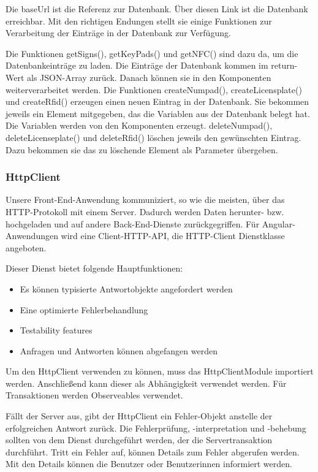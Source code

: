 Die baseUrl ist die Referenz zur Datenbank. Über diesen Link ist die Datenbank erreichbar. Mit den richtigen Endungen stellt sie einige Funktionen zur Verarbeitung der Einträge in der Datenbank zur Verfügung.

Die Funktionen getSigns(), getKeyPads() und getNFC() sind dazu da, um die Datenbankeinträge zu laden. Die Einträge der Datenbank kommen im return-Wert als JSON-Array zurück. Danach können sie in den Komponenten weiterverarbeitet werden.
Die Funktionen createNumpad(), createLicensplate() und createRfid() erzeugen einen neuen Eintrag in der Datenbank. Sie bekommen jeweils ein Element mitgegeben, das die Variablen aus der Datenbank belegt hat. Die Variablen werden von den Komponenten erzeugt.
deleteNumpad(), deleteLicenseplate() und deleteRfid() löschen jeweils den gewünschten Eintrag. Dazu bekommen sie das zu löschende Element als Parameter übergeben.


\subsubsection{HttpClient}
Unsere Front-End-Anwendung kommuniziert, so wie die meisten, über das HTTP-Protokoll mit einem Server. Dadurch werden Daten herunter- bzw. hochgeladen und auf andere Back-End-Dienste zurückgegriffen. Für Angular-Anwendungen wird eine Client-HTTP-API, die HTTP-Client Dienstklasse angeboten.

Dieser Dienst bietet folgende Hauptfunktionen:
\begin{itemize}
    \item Es können typisierte Antwortobjekte angefordert werden
    \item Eine optimierte Fehlerbehandlung
    \item Testability features
    \item Anfragen und Antworten können abgefangen werden    
\end{itemize}

Um den HttpClient verwenden zu können, muss das HttpClientModule importiert werden. Anschließend kann dieser als Abhängigkeit verwendet werden. Für Transaktionen werden Observeables verwendet.

Fällt der Server aus, gibt der HttpClient ein Fehler-Objekt anstelle der erfolgreichen Antwort zurück. Die Fehlerprüfung, -interpretation und -behebung sollten von dem Dienst durchgeführt werden, der die Servertransaktion durchführt. Tritt ein Fehler auf, können Details zum Fehler abgerufen werden. Mit den Details können die Benutzer oder Benutzerinnen informiert werden. 

